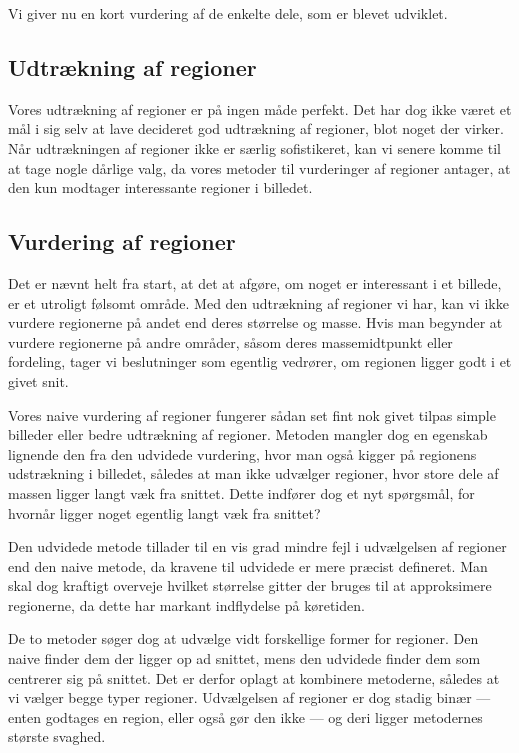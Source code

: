 {
{\sffamily Vi giver nu en kort vurdering af de enkelte dele, som er
blevet udviklet.
}

\subsection{Udtrækning af regioner}
Vores udtrækning af regioner er på ingen måde perfekt. Det har dog
ikke været et mål i sig selv at lave decideret god udtrækning af
regioner, blot noget der virker. Når udtrækningen af regioner ikke er
særlig sofistikeret, kan vi senere komme til at tage nogle dårlige valg,
da vores metoder til vurderinger af regioner antager, at den kun modtager
interessante regioner i billedet.

\subsection{Vurdering af regioner}
Det er nævnt helt fra start, at det at afgøre, om noget er
interessant i et billede, er et utroligt følsomt område. Med den
udtrækning af regioner vi har, kan vi ikke vurdere regionerne på andet
end deres størrelse og masse. Hvis man begynder at vurdere regionerne på
andre områder, såsom deres massemidtpunkt eller fordeling, tager vi
beslutninger som egentlig vedrører, om regionen ligger godt i et givet
snit.

Vores naive vurdering af regioner fungerer sådan set fint nok givet
tilpas simple billeder eller bedre udtrækning af regioner. Metoden
mangler dog en egenskab lignende den fra den udvidede vurdering, hvor
man også kigger på regionens udstrækning i billedet, således at man ikke
udvælger regioner, hvor store dele af massen ligger langt væk fra
snittet. Dette indfører dog et nyt spørgsmål, for hvornår ligger noget
egentlig langt væk fra snittet?

Den udvidede metode tillader til en vis grad mindre fejl i udvælgelsen
af regioner end den naive metode, da kravene til udvidede er mere præcist
defineret. Man skal dog kraftigt overveje hvilket størrelse gitter der
bruges til at approksimere regionerne, da dette har markant indflydelse
på køretiden.

De to metoder søger dog at udvælge vidt forskellige former for regioner.
Den naive finder dem der ligger op ad snittet, mens den udvidede finder
dem som centrerer sig på snittet. Det er derfor oplagt at kombinere
metoderne, således at vi vælger begge typer regioner. Udvælgelsen af
regioner er dog stadig binær --- enten godtages en region, eller også
gør den ikke --- og deri ligger metodernes største svaghed.

}
